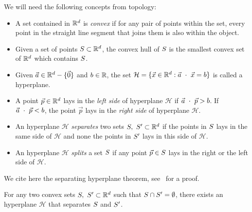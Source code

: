 \documentclass{article}
\newcommand{\cH}{\mathcal{H}}
\begin{document}
We will need the following concepts from topology:
\begin{itemize}
\item A  set contained in $\mathbb{R}^d$  is \textit{convex} if for any
  pair of points within the set, every point in the straight line
  segment that joins them is also within the object.
\item Given a set of points $S\subset\mathbb{R}^{d}$, the convex hull of $S$ is the
  smallest convex set of $\mathbb{R}^{d}$ which contains $S$.
\item   Given $\vec{a}\in\mathbb{R}^d-\{\vec{0}\}$ and $b\in\mathbb{R}$, the set 
  $\cH = \{\vec{x}\in\RR^d : \dotProd{\vec{a}}{\vec{x}}=b\}$ is called
  a hyperplane.
\item A point $\vec{p}\in\mathbb{R}^{d}$ lays in the \textit{left side} of
  hyperplane $\cH$ if $\vec{a}\ \cdot \ \vec{p}>b$. If 
  $\vec{a}\ \cdot \ \vec{p} < b$, the point $\vec{p}$ lays  in the
  \textit{right side} of hyperplane $\cH$.
\item An hyperplane $\cH$ \textit{separates} two sets $S,\
  S'\subset\mathbb{R}^d$ if  the points in $S$ lays in the same side
  of $\cH$ and none the points in $S'$ lays in this side of
  $\cH$.
\item An hyperplane $\cH$ \textit{splits} a set $S$ if any point
  $\vec{p}\in S$ lays in the right or the left side of $\cH$. 
\end{itemize}
We cite here  the separating hyperplane theorem, 
see~\cite[page 46]{BoydLieven04} for a proof. 
\begin{lemma}
  \label{lem:maximum_separation}
  For any two convex sets $S,\ S'\subset \mathbb{R}^d$ such that
  $S\cap S' =  \emptyset$,  there exists an   hyperplane $\cH$
  that separates $S$ and $S'$.
\end{lemma}
\end{document}

